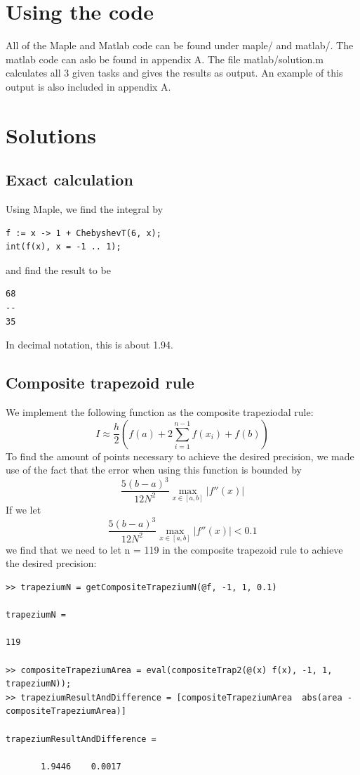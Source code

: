 \documentclass[11pt, a4paper, titlepage, openright]{article}
\begin{document}
\section{Using the code}
    All of the Maple and Matlab code can be found under maple/ and matlab/. The matlab code can aslo be found in appendix A.
    The file matlab/solution.m calculates all 3 given tasks and gives the results as output. An example of this output is also included in appendix A.

\newpage

\section{Solutions}
\subsection{Exact calculation}
Using Maple, we find the integral by

\begin{lstlisting}
f := x -> 1 + ChebyshevT(6, x);
int(f(x), x = -1 .. 1);
\end{lstlisting}
and find the result to be
\begin{lstlisting}
68
--
35
\end{lstlisting}
In decimal notation, this is about 1.94.


\subsection{Composite trapezoid rule}
We implement the following function as the composite trapeziodal rule:
\[ I \approx \frac{h}{2} (f(a) + 2 \sum_{i=1}^{n-1} f(x_i) + f(b)) \]
To find the amount of points necessary to achieve the desired precision, we made use of the fact that the error when using this function is bounded by
\[ \frac{5(b-a)^3}{12 N^2} \max_{x \in [a, b]} |f''(x)| \]
If we let
\[ \frac{5(b-a)^3}{12 N^2} \max_{x \in [a, b]} |f''(x)| < 0.1 \]
we find that we need to let n = 119 in the composite trapezoid rule to achieve the desired precision:
\begin{lstlisting}
>> trapeziumN = getCompositeTrapeziumN(@f, -1, 1, 0.1)

trapeziumN =

119

>> compositeTrapeziumArea = eval(compositeTrap2(@(x) f(x), -1, 1, trapeziumN));
>> trapeziumResultAndDifference = [compositeTrapeziumArea  abs(area - compositeTrapeziumArea)]

trapeziumResultAndDifference =

       1.9446    0.0017
\end{lstlisting}
\end{document}
